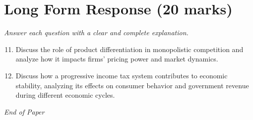 \documentclass[12pt]{article}
\begin{document}
\section*{Long Form Response (20 marks)}
\textit{Answer each question with a clear and complete explanation.}
\begin{enumerate}[label=\arabic*.]
\setcounter{enumi}{10}
\item Discuss the role of product differentiation in monopolistic competition and analyze how it impacts firms' pricing power and market dynamics.
\item Discuss how a progressive income tax system contributes to economic stability, analyzing its effects on consumer behavior and government revenue during different economic cycles.
\end{enumerate}

\vfill
\noindent\textit{End of Paper}
\end{document}
